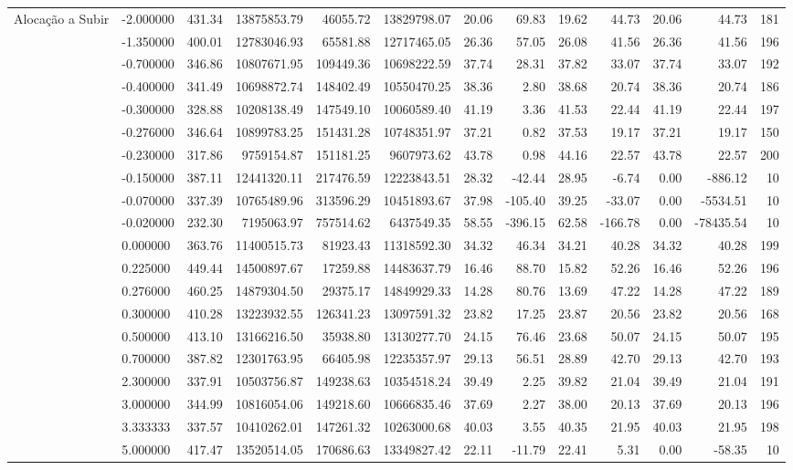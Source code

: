 \begin{tabular}{llrrrrrrrrrrr}
\cline{1-13}
\multirow[t]{20}{*}{Alocação a Subir} & -2.000000 & 431.34 & 13875853.79 & 46055.72 & 13829798.07 & 20.06 & 69.83 & 19.62 & 44.73 & 20.06 & 44.73 & 181 \\
 & -1.350000 & 400.01 & 12783046.93 & 65581.88 & 12717465.05 & 26.36 & 57.05 & 26.08 & 41.56 & 26.36 & 41.56 & 196 \\
 & -0.700000 & 346.86 & 10807671.95 & 109449.36 & 10698222.59 & 37.74 & 28.31 & 37.82 & 33.07 & 37.74 & 33.07 & 192 \\
 & -0.400000 & 341.49 & 10698872.74 & 148402.49 & 10550470.25 & 38.36 & 2.80 & 38.68 & 20.74 & 38.36 & 20.74 & 186 \\
 & -0.300000 & 328.88 & 10208138.49 & 147549.10 & 10060589.40 & 41.19 & 3.36 & 41.53 & 22.44 & 41.19 & 22.44 & 197 \\
 & -0.276000 & 346.64 & 10899783.25 & 151431.28 & 10748351.97 & 37.21 & 0.82 & 37.53 & 19.17 & 37.21 & 19.17 & 150 \\
 & -0.230000 & 317.86 & 9759154.87 & 151181.25 & 9607973.62 & 43.78 & 0.98 & 44.16 & 22.57 & 43.78 & 22.57 & 200 \\
 & -0.150000 & 387.11 & 12441320.11 & 217476.59 & 12223843.51 & 28.32 & -42.44 & 28.95 & -6.74 & 0.00 & -886.12 & 10 \\
 & -0.070000 & 337.39 & 10765489.96 & 313596.29 & 10451893.67 & 37.98 & -105.40 & 39.25 & -33.07 & 0.00 & -5534.51 & 10 \\
 & -0.020000 & 232.30 & 7195063.97 & 757514.62 & 6437549.35 & 58.55 & -396.15 & 62.58 & -166.78 & 0.00 & -78435.54 & 10 \\
 & 0.000000 & 363.76 & 11400515.73 & 81923.43 & 11318592.30 & 34.32 & 46.34 & 34.21 & 40.28 & 34.32 & 40.28 & 199 \\
 & 0.225000 & 449.44 & 14500897.67 & 17259.88 & 14483637.79 & 16.46 & 88.70 & 15.82 & 52.26 & 16.46 & 52.26 & 196 \\
 & 0.276000 & 460.25 & 14879304.50 & 29375.17 & 14849929.33 & 14.28 & 80.76 & 13.69 & 47.22 & 14.28 & 47.22 & 189 \\
 & 0.300000 & 410.28 & 13223932.55 & 126341.23 & 13097591.32 & 23.82 & 17.25 & 23.87 & 20.56 & 23.82 & 20.56 & 168 \\
 & 0.500000 & 413.10 & 13166216.50 & 35938.80 & 13130277.70 & 24.15 & 76.46 & 23.68 & 50.07 & 24.15 & 50.07 & 195 \\
 & 0.700000 & 387.82 & 12301763.95 & 66405.98 & 12235357.97 & 29.13 & 56.51 & 28.89 & 42.70 & 29.13 & 42.70 & 193 \\
 & 2.300000 & 337.91 & 10503756.87 & 149238.63 & 10354518.24 & 39.49 & 2.25 & 39.82 & 21.04 & 39.49 & 21.04 & 191 \\
 & 3.000000 & 344.99 & 10816054.06 & 149218.60 & 10666835.46 & 37.69 & 2.27 & 38.00 & 20.13 & 37.69 & 20.13 & 196 \\
 & 3.333333 & 337.57 & 10410262.01 & 147261.32 & 10263000.68 & 40.03 & 3.55 & 40.35 & 21.95 & 40.03 & 21.95 & 198 \\
 & 5.000000 & 417.47 & 13520514.05 & 170686.63 & 13349827.42 & 22.11 & -11.79 & 22.41 & 5.31 & 0.00 & -58.35 & 10 \\
\cline{1-13}
\bottomrule
\end{tabular}
